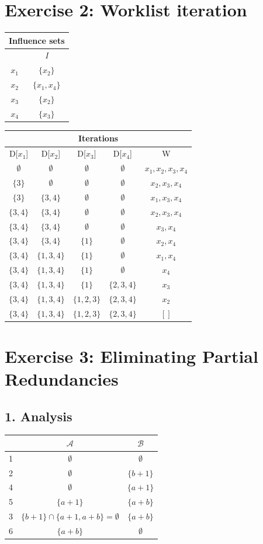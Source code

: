 \documentclass[11pt,a4paper]{scrartcl}
\begin{document}
\section*{Exercise 2: Worklist iteration}
\begin{tabular}{|c|c|}
\multicolumn{2}{c}{Influence sets}\\
\hline
 & \textit{I}\\
\hline
$x_1$ & $\{x_2\}$ \\
$x_2$ & $\{x_1, x_4\}$ \\
$x_3$ & $\{x_2\}$ \\
$x_4$ & $\{x_3\}$ \\
\hline
\end{tabular}
\begin{tabular}{|c|c|c|c||c|}
\multicolumn{5}{c}{Iterations}\\
\hline
D[$x_1$] & D[$x_2$] & D[$x_3$] & D[$x_4$] & W \\
\hline
$\emptyset$ & $\emptyset$ & $\emptyset$ & $\emptyset$ & $x_1, x_2, x_3, x_4$ \\
$\{3\}$ & $\emptyset$ & $\emptyset$ & $\emptyset$ & $x_2, x_3, x_4$ \\
$\{3\}$ & $\{3, 4\}$ & $\emptyset$ & $\emptyset$ & $x_1, x_3, x_4$ \\
$\{3, 4\}$ & $\{3, 4\}$ & $\emptyset$ & $\emptyset$ & $x_2, x_3, x_4$ \\
$\{3, 4\}$ & $\{3, 4\}$ & $\emptyset$ & $\emptyset$ & $x_3, x_4$ \\
$\{3, 4\}$ & $\{3, 4\}$ & $\{1\}$ & $\emptyset$ & $x_2, x_4$ \\
$\{3, 4\}$ & $\{1, 3, 4\}$ & $\{1\}$ & $\emptyset$ & $x_1, x_4$ \\
$\{3, 4\}$ & $\{1, 3, 4\}$ & $\{1\}$ & $\emptyset$ & $x_4$ \\
$\{3, 4\}$ & $\{1, 3, 4\}$ & $\{1\}$ & $\{2, 3, 4\}$ & $x_3$ \\
$\{3, 4\}$ & $\{1, 3, 4\}$ & $\{1, 2, 3\}$ & $\{2, 3, 4\}$ & $x_2$ \\
$\{3, 4\}$ & $\{1, 3, 4\}$ & $\{1, 2, 3\}$ & $\{2, 3, 4\}$ & $[]$ \\
\hline
\end{tabular}


\section*{Exercise 3: Eliminating Partial Redundancies}
\subsection*{1. Analysis}
\begin{tabular}{|c|c|c|}
\hline
& $\mathcal{A}$ & $\mathcal{B}$\\
\hline
1 & $\emptyset$ & $\emptyset$ \\
2 & $\emptyset$ & $\{b+1\}$ \\
4 & $\emptyset$ & $\{a+1\}$ \\
5 & $\{a+1\}$ & $\{a+b\}$ \\
3 & $\{b+1\} \cap \{a+1, a+b\} = \emptyset$ & $\{a+b\}$ \\
6 & $\{a+b\}$ & $\emptyset$ \\
\hline
\end{tabular}
\end{document}
